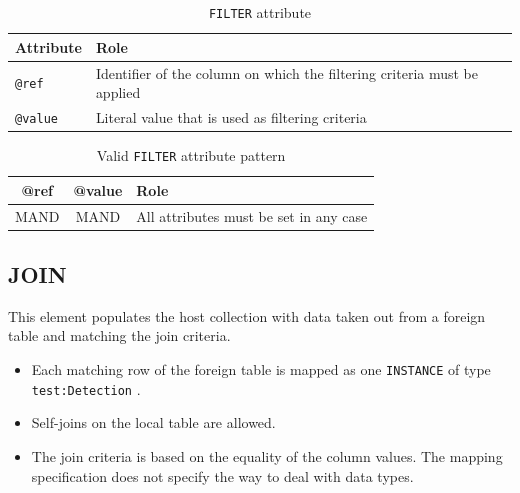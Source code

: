 \documentclass[11pt,a4paper]{ivoa}
\begin{document}
\begin{table}[!htbp]
\small
\centering
\begin{tabulary}{\linewidth}{|L|J|}
       \hline
           \textbf{Attribute} &  
           \textbf{Role} \\
       \hline  \hline
           \texttt{@ref}    & 
           Identifier of the column on which the filtering criteria must be applied \\       
        \hline 
           \texttt{@value}    & 
           Literal value that is used as filtering criteria \\       
        \hline 
\end{tabulary}
\caption{\texttt{FILTER} attribute} 
\label{tbl:filter-att}
\end{table}

\begin{table}[!t]
\small
\centering
\begin{tabulary}{\linewidth}{|C|CJ|}
       \hline
           \textbf{@ref} &  
           \textbf{@value} &                     

           \textbf{Role} \\
       \hline   \hline
           MAND    &            

           MAND    & 
           All attributes must be set in any case \\       
       \hline 
\end{tabulary}
\caption{Valid \texttt{FILTER} attribute pattern} 
\label{tbl:filter-patterns}
\end{table}


%
%

\subsection{JOIN}
This element populates the host collection with data taken out from a foreign table and matching the join criteria.

\begin{itemize}
    \item Each matching row of the foreign table is mapped as  one \texttt{INSTANCE} of type \texttt{test:Detection} .
    \item Self-joins  on the local table are allowed.
    \item The join criteria is based on the equality of the column values. 
             The mapping specification does not specify the way to deal with data types.
\end{itemize}
\end{document}
